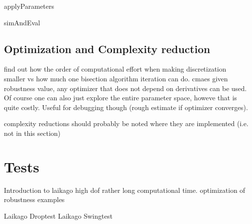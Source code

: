     applyParameters

    simAndEval

\subsection{Optimization and Complexity reduction}
    

    find out how the order of computational effort when making discretization smaller vs how much one bisection algorithm iteration can do. 
    cmaes
    given robustness value, any optimizer that does not depend on derivatives can be used. 
    Of course one can also just explore the entire parameter space, howeve that is quite costly. Useful for debugging though (rough estimate if optimizer converges).

    complexity reductions should probably be noted where they are implemented (i.e. not in this section)

\section{Tests}


    Introduction to laikago
        high dof
        rather long computational time. 
    optimization of robustness examples

    Laikago Droptest
    Laikago Swingtest
